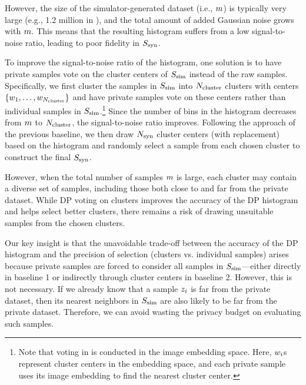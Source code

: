However, the size of the simulator-generated dataset (i.e., $m$) is typically very large (e.g., 1.2 million in \citet{bae2023digiface}), and the total amount of added Gaussian noise grows with $m$. This means that the resulting histogram suffers from a low signal-to-noise ratio, leading to poor fidelity in $S_{\mathrm{syn}}$.

To improve the signal-to-noise ratio of the histogram, one solution is to have private samples vote on the cluster centers of $S_{\text{sim}}$ instead of the raw samples. Specifically, we first cluster the samples in $S_{\text{sim}}$ into $N_\text{cluster}$ clusters with centers $\left\{ w_1,\ldots,w_{N_\text{cluster}} \right\}$ and have private samples vote on these centers rather than individual samples in $S_{\text{sim}}$.\footnote{Note that voting in \citet{lin2023differentially} is conducted in the image embedding space. Here, $w_i$s represent cluster centers in the embedding space, and each private sample uses its image embedding to find the nearest cluster center.}
Since the number of bins in the histogram decreases from $m$ to $N_\text{cluster}$, the signal-to-noise ratio improves. Following the approach of the previous baseline, we then draw $N_{\mathrm{syn}}$ cluster centers (with replacement) based on the histogram and randomly select a sample from each chosen cluster to construct the final $S_{\mathrm{syn}}$.

However, when the total number of samples $m$ is large, each cluster may contain a diverse set of samples, including those both close to and far from the private dataset. While DP voting on clusters improves the accuracy of the DP histogram and helps select better clusters, there remains a risk of drawing unsuitable samples from the chosen clusters.

 Our key insight is that the unavoidable trade-off between the accuracy of the DP histogram and the precision of selection (clusters vs. individual samples) arises because private samples are forced to consider all samples in $S_{\text{sim}}$—either directly in baseline 1 or indirectly through cluster centers in baseline 2. However, this is not necessary. If we already know that a sample $z_i$ is far from the private dataset, then its nearest neighbors in $S_{\text{sim}}$ are also likely to be far from the private dataset. Therefore, we can avoid wasting the privacy budget on evaluating such samples. 

